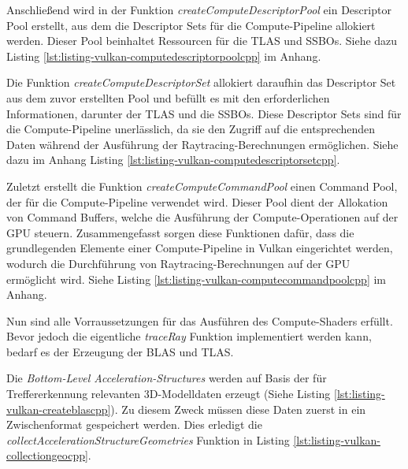 \documentclass[11pt]{scrartcl}
\begin{document}
	Anschließend wird in der Funktion \textit{createComputeDescriptorPool} ein Descriptor Pool erstellt, aus dem die Descriptor Sets für die Compute-Pipeline allokiert werden. Dieser Pool beinhaltet Ressourcen für die TLAS und SSBOs. Siehe dazu Listing \ref{lst:listing-vulkan-computedescriptorpoolcpp} im Anhang.
	
	Die Funktion \textit{createComputeDescriptorSet} allokiert daraufhin das Descriptor Set aus dem zuvor erstellten Pool und befüllt es mit den erforderlichen Informationen, darunter der TLAS und die SSBOs. Diese Descriptor Sets sind für die Compute-Pipeline unerlässlich, da sie den Zugriff auf die entsprechenden Daten während der Ausführung der Raytracing-Berechnungen ermöglichen. Siehe dazu im Anhang Listing \ref{lst:listing-vulkan-computedescriptorsetcpp}.

	
	Zuletzt erstellt die Funktion \textit{createComputeCommandPool} einen Command Pool, der für die Compute-Pipeline verwendet wird. Dieser Pool dient der Allokation von Command Buffers, welche die Ausführung der Compute-Operationen auf der GPU steuern. Zusammengefasst sorgen diese Funktionen dafür, dass die grundlegenden Elemente einer Compute-Pipeline in Vulkan eingerichtet werden, wodurch die Durchführung von Raytracing-Berechnungen auf der GPU ermöglicht wird. Siehe Listing \ref{lst:listing-vulkan-computecommandpoolcpp} im Anhang.
	
	Nun sind alle Vorraussetzungen für das Ausführen des Compute-Shaders erfüllt. Bevor jedoch die eigentliche \textit{traceRay} Funktion implementiert werden kann, bedarf es der Erzeugung der BLAS und TLAS.
	
	Die \textit{Bottom-Level Acceleration-Structures} werden auf Basis der für Treffererkennung relevanten 3D-Modelldaten erzeugt (Siehe Listing \ref{lst:listing-vulkan-createblascpp}). Zu diesem Zweck müssen diese Daten zuerst in ein Zwischenformat gespeichert werden. Dies erledigt die \textit{collectAccelerationStructureGeometries} Funktion in Listing \ref{lst:listing-vulkan-collectiongeocpp}.
	
\end{document}
